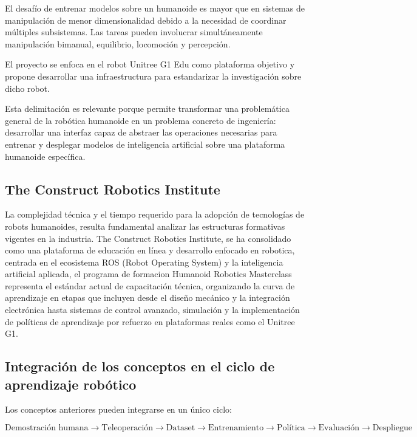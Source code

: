 \documentclass[stu,12pt,floatsintext]{apa7}
\begin{document}
El desafío de entrenar modelos sobre un humanoide es mayor que en sistemas de manipulación de menor dimensionalidad debido a la necesidad de coordinar múltiples subsistemas. Las tareas pueden involucrar simultáneamente manipulación bimanual, equilibrio, locomoción y percepción.

El proyecto se enfoca en el robot Unitree G1 Edu como plataforma objetivo y propone desarrollar una infraestructura para estandarizar la investigación sobre dicho robot.

Esta delimitación es relevante porque permite transformar una problemática general de la robótica humanoide en un problema concreto de ingeniería: desarrollar una interfaz capaz de abstraer las operaciones necesarias para entrenar y desplegar modelos de inteligencia artificial sobre una plataforma humanoide específica.

\subsection{The Construct Robotics Institute}
La complejidad técnica y el tiempo requerido para la adopción de tecnologías de robots humanoides, resulta fundamental analizar las estructuras formativas vigentes en la industria. The Construct Robotics Institute, se ha consolidado como una plataforma de educación en línea y desarrollo enfocado en robotica, centrada en el ecosistema ROS (Robot Operating System) y la inteligencia artificial aplicada, el programa de formacion Humanoid Robotics Masterclass \parencite{theconstruct2026humanoid} representa el estándar actual de capacitación técnica, organizando la curva de aprendizaje en etapas que incluyen desde el diseño mecánico y la integración electrónica hasta sistemas de control avanzado, simulación y la implementación de políticas de aprendizaje por refuerzo  en plataformas reales como el Unitree G1.

\subsection{Integración de los conceptos en el ciclo de aprendizaje robótico}

Los conceptos anteriores pueden integrarse en un único ciclo:

\begin{equation}
\boxed{
\text{Demostración humana}
\rightarrow
\text{Teleoperación}
\rightarrow
\text{Dataset}
\rightarrow
\text{Entrenamiento}
\rightarrow
\text{Política}
\rightarrow
\text{Evaluación}
\rightarrow
\text{Despliegue}
}
\end{equation}
\end{document}
